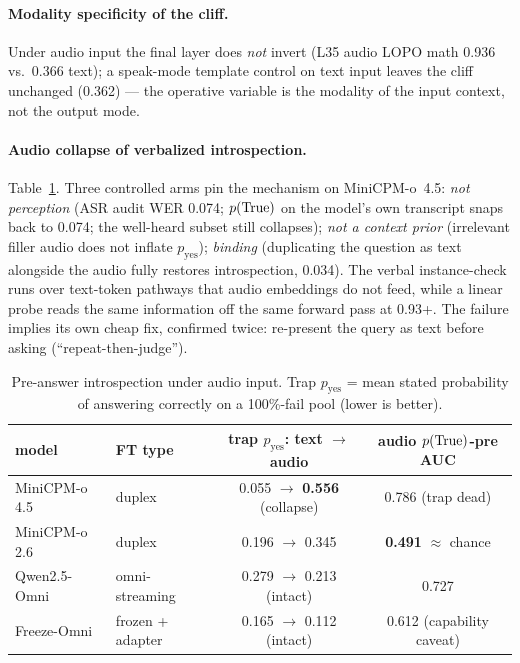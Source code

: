 \paragraph{Modality specificity of the cliff.} Under audio input the
final layer does \emph{not} invert (L35 audio LOPO math 0.936 vs.\ 0.366
text); a speak-mode template control on text input leaves the cliff
unchanged (0.362) --- the operative variable is the modality of the
input context, not the output mode.

\paragraph{Audio collapse of verbalized introspection.}
Table~\ref{tab:audioptrue}. Three controlled arms pin the mechanism on
MiniCPM-o~4.5: \emph{not perception} (ASR audit WER 0.074; $p(\mathrm{True})$ on
the model's own transcript snaps back to 0.074; the well-heard subset
still collapses); \emph{not a context prior} (irrelevant filler audio
does not inflate $p_{\mathrm{yes}}$); \emph{binding} (duplicating the
question as text alongside the audio fully restores introspection,
0.034). The verbal instance-check runs over text-token pathways that
audio embeddings do not feed, while a linear probe reads the same
information off the same forward pass at 0.93+. The failure implies its
own cheap fix, confirmed twice: re-present the query as text before
asking (``repeat-then-judge'').

\begin{table}[h]
\centering\small
\caption{Pre-answer introspection under audio input. Trap
$p_{\mathrm{yes}}$ = mean stated probability of answering correctly on
a 100\%-fail pool (lower is better).}
\label{tab:audioptrue}
\begin{tabular}{llcc}
\toprule
model & FT type & trap $p_{\mathrm{yes}}$: text $\rightarrow$ audio & audio $p(\mathrm{True})$-pre AUC \\
\midrule
MiniCPM-o 4.5 & duplex & 0.055 $\rightarrow$ \textbf{0.556} (collapse) & 0.786 (trap dead) \\
MiniCPM-o 2.6 & duplex & 0.196 $\rightarrow$ 0.345 & \textbf{0.491} $\approx$ chance \\
Qwen2.5-Omni & omni-streaming & 0.279 $\rightarrow$ 0.213 (intact) & 0.727 \\
Freeze-Omni & frozen + adapter & 0.165 $\rightarrow$ 0.112 (intact) & 0.612 (capability caveat) \\
\bottomrule
\end{tabular}
\end{table}


